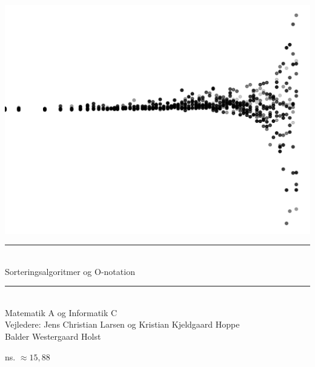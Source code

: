






\selectfont

\setcounter{page}{1}


\begin{titlepage}
	\begin{center}
		
			
		\includegraphics[width=.35\textwidth,trim=0 0 0 -5cm]{../img/forsidePlot.png}

		\vspace{2.9cm}

		\rule{.6\textwidth}{0.4pt} \\
		\vspace{5mm}
		\huge Sorteringsalgoritmer og O-notation \\
		\vspace{1mm}
		\rule{.6\textwidth}{0.4pt} \\
		\vspace{4mm}
		\Large
		Matematik A og Informatik C \\
		\vspace{5cm}
		\large
		Vejledere: Jens Christian Larsen og Kristian Kjeldgaard Hoppe\\
		\vspace{1cm}
		Balder Westergaard Holst
	\end{center}
	\vspace{2cm}
	\raggedleft
	ns. $\approx 15,88$ 
\end{titlepage}




\tableofcontents
\pagestyle{plain}
\listoffigures

\newpage
\setcounter{page}{1}
\pagestyle{fancy}


\thispagestyle{fancy}









\printbibliography[title=Litteraturliste]



\thispagestyle{fancy}






